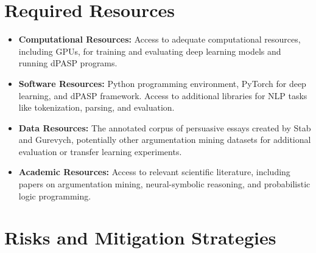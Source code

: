 \documentclass{article}
\begin{document}
\section{Required Resources}

\begin{itemize}
    \item \textbf{Computational Resources:} Access to adequate computational
    resources, including GPUs, for training and evaluating deep learning models
    and running dPASP programs.
    
    \item \textbf{Software Resources:} Python programming environment, PyTorch
    for deep learning, and dPASP framework. Access to additional libraries for
    NLP tasks like tokenization, parsing, and evaluation.
    
    \item \textbf{Data Resources:} The annotated corpus of persuasive essays
    created by Stab and Gurevych, potentially other argumentation mining
    datasets for additional evaluation or transfer learning experiments.
    
    \item \textbf{Academic Resources:} Access to relevant scientific literature,
    including papers on argumentation mining, neural-symbolic reasoning, and
    probabilistic logic programming.
\end{itemize}

\section{Risks and Mitigation Strategies}
\end{document}

